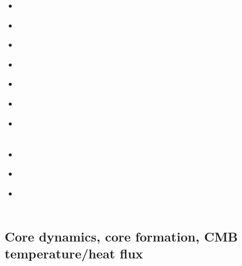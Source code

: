 \begin{scriptsize}
\begin{itemize}
\item[\nineteeneightyeight] 
\textcite{mofo88} \\
\item[\nineteenninetyfour] 
\textcite{chho94} \\
\item[\nineteenninetysix] 
\textcite{vaky96} \\
\item[\twothousandfour] 
\textcite{vavv04b} \\
\item[\twothousandseven] 
\textcite{brva07b} \\
\item[\twothousandeight] 
\textcite{gomm08} \\
\item[\twothousandthirteen] 
\textcite{limc13} \\
\textcite{yosh13} \\
\item[\twothousandfifteen] 
\textcite{rula15} \\
\item[\twothousandseventeen] 
\textcite{taac17} \\
\item[\twothousandtwenty] 
\textcite{mugu20} \\
\textcite{yabt20} \\
\end{itemize}
\end{scriptsize}


\subsection{Core dynamics, core formation, CMB temperature/heat flux}

